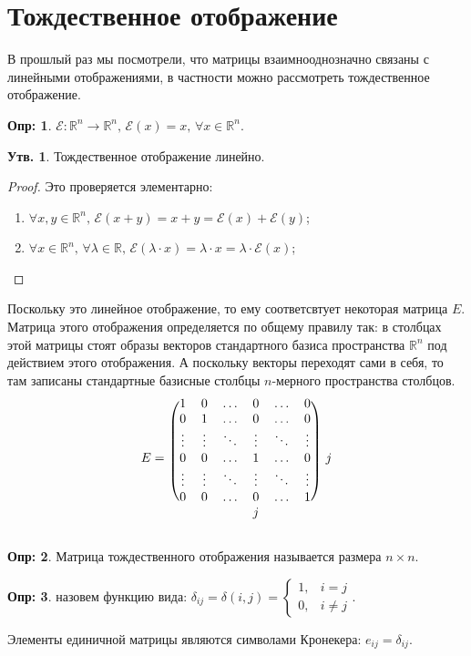 \documentclass[12pt]{article}
\newcommand{\MR}{\mathbb{R}}
\newcommand{\MCE}{\mathcal{E}}
\theoremstyle{definition}
\newtheorem{defn}{Опр:}
\newtheorem{prop}{Утв.}
\begin{document}
\newpage
\section*{Тождественное отображение}
В прошлый раз мы посмотрели, что матрицы взаимнооднозначно связаны с линейными отображениями, в частности можно рассмотреть тождественное отображение.
\begin{defn}
	 $\MCE \colon \MR^n \to \MR^n, \, \MCE(x) = x, \, \forall x \in \MR^n$.
\end{defn}
\begin{prop}
	Тождественное отображение линейно.
\end{prop}
\begin{proof}
	Это проверяется элементарно:
	\begin{enumerate}[label=\arabic*)]
		\item $\forall x,y \in \MR^n, \, \MCE(x + y) = x + y = \MCE(x) + \MCE(y)$;
		\item $\forall x \in \MR^n,\, \forall \lambda \in \MR, \, \MCE(\lambda{\cdot}x) = \lambda{\cdot}x = \lambda{\cdot}\MCE(x)$;
	\end{enumerate}
\end{proof}
Поскольку это линейное отображение, то ему соответсвтует некоторая матрица $E$. Матрица этого отображения определяется по общему правилу так: в столбцах этой матрицы стоят образы векторов стандартного базиса пространства $\MR^n$ под действием этого отображения. А поскольку векторы переходят сами в себя, то там записаны стандартные базисные столбцы $n$-мерного пространства столбцов. 
$$
	\begin{blockarray}{cccccccc}
		\begin{block}{c(cccccc)c}
			& 1 & 0 & \dotsc &  0 & \dotsc & 0 & \\
			& 0 & 1 & \dotsc &  0 & \dotsc & 0 &\\
			& \vdots & \vdots &  \ddots & \vdots & \ddots & \vdots &\\
			E = & 0 & 0 & \dotsc & 1 & \dotsc & 0 & j\\
			& \vdots & \vdots & \ddots & \vdots & \ddots & \vdots &\\
			& 0 & 0 & \dotsc & 0 & \dotsc & 1 &\\
		\end{block}
		&&&&j&&&
	\end{blockarray}
$$
\begin{defn}
	Матрица тождественного отображения называется  размера $n\times n$. 
\end{defn}
\begin{defn}
	 назовем функцию вида: $\delta_{ij} = \delta(i,j) = 
		\begin{cases}
			1, & i =j \\
			0, & i \neq j
		\end{cases}$.	 
\end{defn}
Элементы единичной матрицы являются символами Кронекера: $e_{ij} = \delta_{ij}$.
\end{document}
